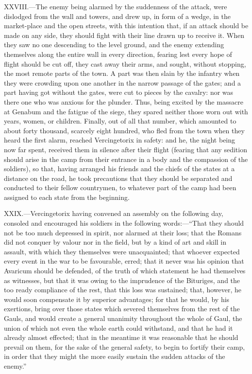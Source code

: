 XXVIII.—The enemy being alarmed by the suddenness of the attack, were
dislodged from the wall and towers, and drew up, in form of a wedge, in
the market-place and the open streets, with this intention that, if an
attack should be made on any side, they should fight with their line
drawn up to receive it. When they saw no one descending to the level
ground, and the enemy extending themselves along the entire wall in
every direction, fearing lest every hope of flight should be cut off,
they cast away their arms, and sought, without stopping, the most remote
parts of the town. A part was then slain by the infantry when they were
crowding upon one another in the narrow passage of the gates; and a part
having got without the gates, were cut to pieces by the cavalry: nor was
there one who was anxious for the plunder. Thus, being excited by the
massacre at Genabum and the fatigue of the siege, they spared neither
those worn out with years, women, or children. Finally, out of all that
number, which amounted to about forty thousand, scarcely eight hundred,
who fled from the town when they heard the first alarm, reached
Vercingetorix in safety: and he, the night being now far spent, received
them in silence after their flight (fearing that any sedition should
arise in the camp from their entrance in a body and the compassion of
the soldiers), so that, having arranged his friends and the chiefs of
the states at a distance on the road, he took precautions that they
should be separated and conducted to their fellow countrymen, to
whatever part of the camp had been assigned to each state from the
beginning.

XXIX.—Vercingetorix having convened an assembly on the following day,
consoled and encouraged his soldiers in the following words:—``That they
should not be too much depressed in spirit, nor alarmed at their loss;
that the Romans did not conquer by valour nor in the field, but by a
kind of art and skill in assault, with which they themselves were
unacquainted; that whoever expected every event in the war to be
favourable, erred; that it never was his opinion that Avaricum should be
defended, of the truth of which statement he had themselves as
witnesses, but that it was owing to the imprudence of the Bituriges, and
the too ready compliance of the rest, that this loss was sustained;
that, however, he would soon compensate it by superior advantages; for
that he would, by his exertions, bring over those states which severed
themselves from the rest of the Gauls, and would create a general
unanimity throughout the whole of Gaul, the union of which not even the
whole earth could withstand, and that he had it already almost effected;
that in the meantime it was reasonable that he should prevail on them,
for the sake of the general safety, to begin to fortify their camp, in
order that they might the more easily sustain the sudden attacks of the
enemy.''

